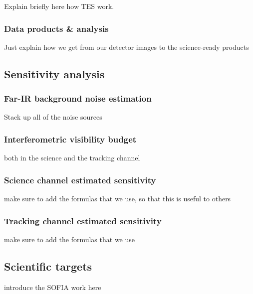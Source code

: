 Explain briefly here how TES work.

\subsubsection{Data products \& analysis}
Just explain how we get from our detector images to the science-ready products

\subsection{Sensitivity analysis}

\subsubsection{Far-IR background noise estimation}
Stack up all of the noise sources
\subsubsection{Interferometric visibility budget}
both in the science and the tracking channel
\subsubsection{Science channel estimated sensitivity}
make sure to add the formulas that we use, so that this is useful to others

\subsubsection{Tracking channel estimated sensitivity}
make sure to add the formulas that we use

\subsection{Scientific targets}

introduce the SOFIA work here